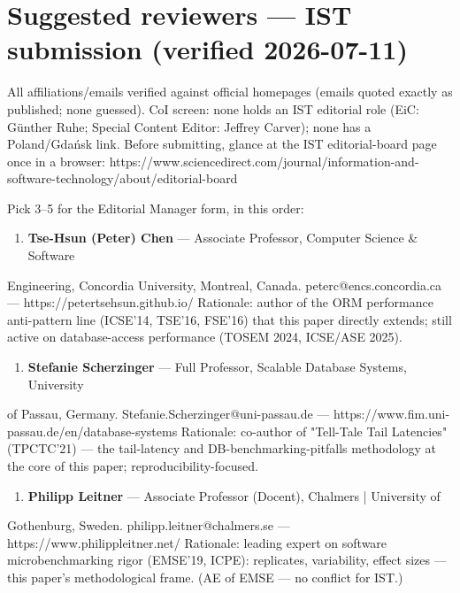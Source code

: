 \documentclass[11pt,a4paper]{article}
\begin{document}
\section*{Suggested reviewers --- IST submission (verified 2026-07-11)}

All affiliations/emails verified against official homepages (emails quoted exactly as published; none guessed). CoI screen: none holds an IST editorial role (EiC: Günther Ruhe; Special Content Editor: Jeffrey Carver); none has a Poland/Gdańsk link. Before submitting, glance at the IST editorial-board page once in a browser: https://www.sciencedirect.com/journal/information-and-software-technology/about/editorial-board

Pick 3--5 for the Editorial Manager form, in this order:

\begin{enumerate}
  \item \textbf{Tse-Hsun (Peter) Chen} --- Associate Professor, Computer Science \& Software
\end{enumerate}

Engineering, Concordia University, Montreal, Canada. peterc@encs.concordia.ca --- https://petertsehsun.github.io/ Rationale: author of the ORM performance anti-pattern line (ICSE'14, TSE'16, FSE'16) that this paper directly extends; still active on database-access performance (TOSEM 2024, ICSE/ASE 2025).

\begin{enumerate}
  \item \textbf{Stefanie Scherzinger} --- Full Professor, Scalable Database Systems, University
\end{enumerate}

of Passau, Germany. Stefanie.Scherzinger@uni-passau.de --- https://www.fim.uni-passau.de/en/database-systems Rationale: co-author of "Tell-Tale Tail Latencies" (TPCTC'21) --- the tail-latency and DB-benchmarking-pitfalls methodology at the core of this paper; reproducibility-focused.

\begin{enumerate}
  \item \textbf{Philipp Leitner} --- Associate Professor (Docent), Chalmers | University of
\end{enumerate}

Gothenburg, Sweden. philipp.leitner@chalmers.se --- https://www.philippleitner.net/ Rationale: leading expert on software microbenchmarking rigor (EMSE'19, ICPE): replicates, variability, effect sizes --- this paper's methodological frame. (AE of EMSE --- no conflict for IST.)
\end{document}
